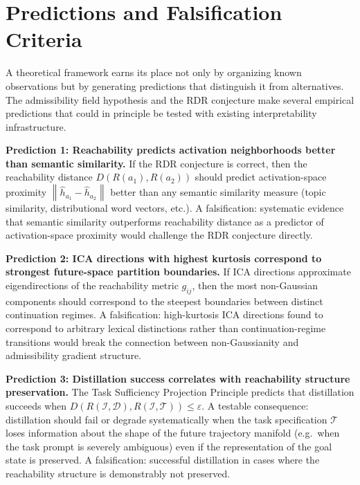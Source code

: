 \documentclass[12pt, a4paper]{article}
\theoremstyle{plain}
\theoremstyle{definition}
\theoremstyle{remark}
\newcommand{\norm}[1]{\left\|#1\right\|}
\newcommand{\hh}{\hat{h}}
\begin{document}
\section{Predictions and Falsification Criteria}

A theoretical framework earns its place not only by organizing known
observations but by generating predictions that distinguish it from
alternatives. The admissibility field hypothesis and the RDR conjecture
make several empirical predictions that could in principle be tested with
existing interpretability infrastructure.

\textbf{Prediction 1: Reachability predicts activation neighborhoods better
than semantic similarity.} If the RDR conjecture is correct, then the
reachability distance $D(R(a_1), R(a_2))$ should predict activation-space
proximity $\norm{\hh_{a_1} - \hh_{a_2}}$ better than any semantic similarity
measure (topic similarity, distributional word vectors, etc.). A falsification:
systematic evidence that semantic similarity outperforms reachability distance
as a predictor of activation-space proximity would challenge the RDR conjecture
directly.

\textbf{Prediction 2: ICA directions with highest kurtosis correspond to
strongest future-space partition boundaries.} If ICA directions approximate
eigendirections of the reachability metric $g_{ij}$, then the most non-Gaussian
components should correspond to the steepest boundaries between distinct
continuation regimes. A falsification: high-kurtosis ICA directions found to
correspond to arbitrary lexical distinctions rather than continuation-regime
transitions would break the connection between non-Gaussianity and admissibility
gradient structure.

\textbf{Prediction 3: Distillation success correlates with reachability
structure preservation.} The Task Sufficiency Projection Principle predicts
that distillation succeeds when $D(R(\mathcal{I}, \mathcal{D}), R(\mathcal{I},
\mathcal{T})) \leq \varepsilon$. A testable consequence: distillation should
fail or degrade systematically when the task specification $\mathcal{T}$ loses
information about the shape of the future trajectory manifold (e.g.\ when the
task prompt is severely ambiguous) even if the representation of the goal state
is preserved. A falsification: successful distillation in cases where the
reachability structure is demonstrably not preserved.
\end{document}
